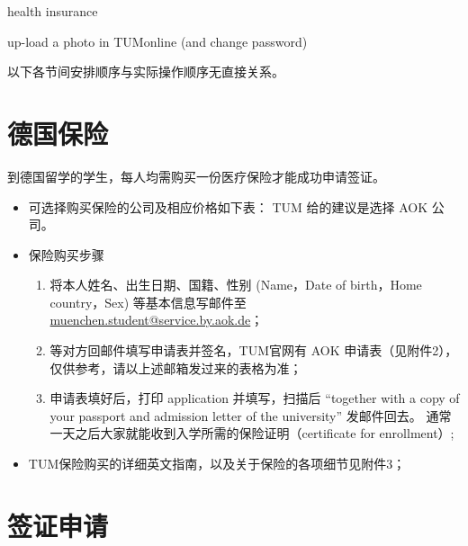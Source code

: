 \documentclass{article}
\begin{document}
\begin{Form}
\begin{enumerate}[label = {\CheckBox[width=.1in,height=.1in,name=process\theenumi]{}}]
\begin{multicols}{2}
\begin{enumerate}[label = {\CheckBox[width=.1in,height=.1in,name=subprocess\theenumii]{}}]
    \item health insurance
    \item up-load a photo in TUMonline (and change password)
  \end{enumerate}
  \end{multicols}
  \end{enumerate}
\end{Form}

\newpage
\tableofcontents
\newpage

以下各节间安排顺序与实际操作顺序无直接关系。

\section{德国保险}
到德国留学的学生，每人均需购买一份医疗保险才能成功申请签证。%
\begin{itemize}
\item 可选择购买保险的公司及相应价格如下表：%
TUM 给的建议是选择 AOK 公司。
\item 保险购买步骤
\begin{enumerate}
\item 将本人姓名、出生日期、国籍、性别 (Name，Date of birth，Home country，Sex) 等基本信息写邮件至 \sloppy \href{mailto:muenchen.student@service.by.aok.de}{muenchen.student@service.by.aok.de}；%
\item 等对方回邮件填写申请表并签名，TUM官网有 AOK 申请表（见附件2），仅供参考，请以上述邮箱发过来的表格为准；
\item 申请表填好后，打印 application 并填写，扫描后 ``together with a copy of your passport and admission letter of the university'' 发邮件回去。%
通常一天之后大家就能收到入学所需的保险证明（certificate for enrollment）;
\end{enumerate}
\item TUM保险购买的详细英文指南，以及关于保险的各项细节见附件3；
\end{itemize}

\section{签证申请}
\end{document}

